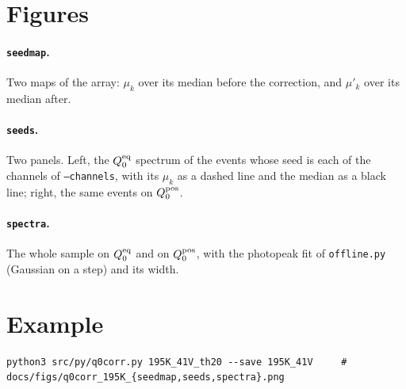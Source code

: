 \documentclass[11pt]{article}
\newcommand{\code}[1]{\texttt{#1}}
\begin{document}
\section{Figures}

\paragraph{\code{seedmap}.} Two maps of the array: $\mu_k$ over its
median before the correction, and $\mu'_k$ over its median after.

\paragraph{\code{seeds}.} Two panels. Left, the $Q^{\rm eq}_0$ spectrum
of the events whose seed is each of the channels of \code{--channels},
with its $\mu_k$ as a dashed line and the median as a black line; right,
the same events on $Q^{\rm pos}_0$.

\paragraph{\code{spectra}.} The whole sample on $Q^{\rm eq}_0$ and on
$Q^{\rm pos}_0$, with the photopeak fit of \code{offline.py} (Gaussian on
a step) and its width.

\section{Example}

\begin{lstlisting}
python3 src/py/q0corr.py 195K_41V_th20 --save 195K_41V     # docs/figs/q0corr_195K_{seedmap,seeds,spectra}.png
\end{lstlisting}
\end{document}
